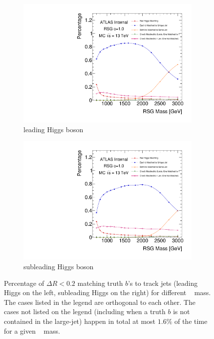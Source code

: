 \begin{figure}[htbp!]
    \captionsetup{justification=centering}
    \begin{subfigure}[b]{0.45\textwidth}
        \includegraphics[width=\textwidth,angle=-90]{figures/boosted/Truth/truth_b-matching.pdf}
        \caption{leading Higgs boson}
        \label{fig:truth-bmatch-lead}
    \end{subfigure}
    \quad
    \begin{subfigure}[b]{0.45\textwidth}
        \includegraphics[width=\textwidth,angle=-90]{figures/boosted/Truth/truth_b-matching-sublead.pdf}
        \caption{subleading Higgs boson}
        \label{fig:truth-bmatch-subl}
    \end{subfigure}
\caption{Percentage of $\Delta R<0.2$ matching truth $b$'s to track jets (leading Higgs on the left, subleading Higgs on the right) for different \Grav~ mass. The cases listed in the legend are orthogonal to each other. The cases not listed on the legend (including when a truth $b$ is not contained in the large-\R jet) happen in total at most $1.6\%$ of the time for a given \Grav~ mass. 
}
\end{figure}
